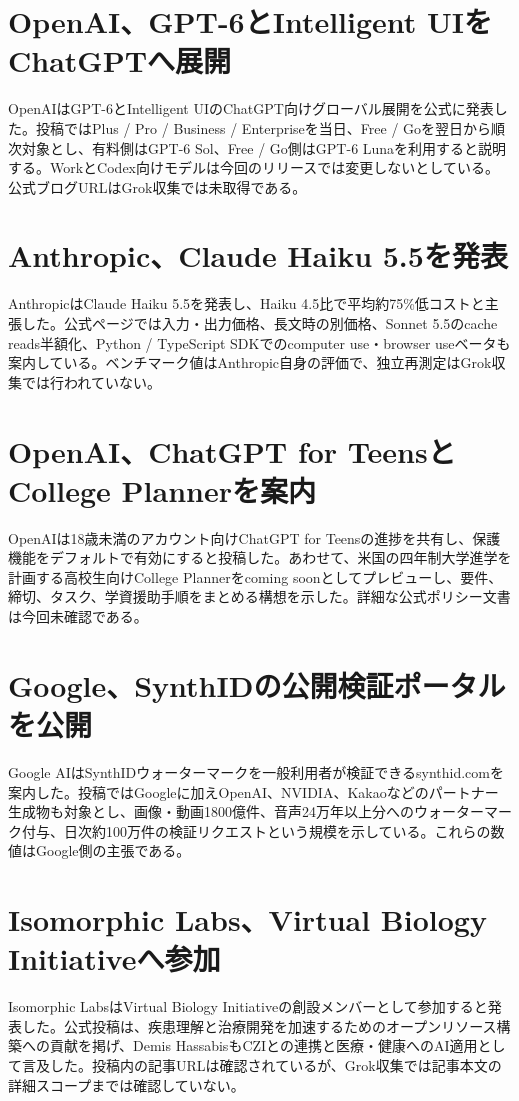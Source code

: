 \section{OpenAI、GPT-6とIntelligent UIをChatGPTへ展開}
OpenAIはGPT-6とIntelligent UIのChatGPT向けグローバル展開を公式に発表した。投稿ではPlus / Pro / Business / Enterpriseを当日、Free / Goを翌日から順次対象とし、有料側はGPT-6 Sol、Free / Go側はGPT-6 Lunaを利用すると説明する。WorkとCodex向けモデルは今回のリリースでは変更しないとしている。公式ブログURLはGrok収集では未取得である。

\section{Anthropic、Claude Haiku 5.5を発表}
AnthropicはClaude Haiku 5.5を発表し、Haiku 4.5比で平均約75\%低コストと主張した。公式ページでは入力・出力価格、長文時の別価格、Sonnet 5.5のcache reads半額化、Python / TypeScript SDKでのcomputer use・browser useベータも案内している。ベンチマーク値はAnthropic自身の評価で、独立再測定はGrok収集では行われていない。

\section{OpenAI、ChatGPT for TeensとCollege Plannerを案内}
OpenAIは18歳未満のアカウント向けChatGPT for Teensの進捗を共有し、保護機能をデフォルトで有効にすると投稿した。あわせて、米国の四年制大学進学を計画する高校生向けCollege Plannerをcoming soonとしてプレビューし、要件、締切、タスク、学資援助手順をまとめる構想を示した。詳細な公式ポリシー文書は今回未確認である。

\section{Google、SynthIDの公開検証ポータルを公開}
Google AIはSynthIDウォーターマークを一般利用者が検証できるsynthid.comを案内した。投稿ではGoogleに加えOpenAI、NVIDIA、Kakaoなどのパートナー生成物も対象とし、画像・動画1800億件、音声24万年以上分へのウォーターマーク付与、日次約100万件の検証リクエストという規模を示している。これらの数値はGoogle側の主張である。

\section{Isomorphic Labs、Virtual Biology Initiativeへ参加}
Isomorphic LabsはVirtual Biology Initiativeの創設メンバーとして参加すると発表した。公式投稿は、疾患理解と治療開発を加速するためのオープンリソース構築への貢献を掲げ、Demis HassabisもCZIとの連携と医療・健康へのAI適用として言及した。投稿内の記事URLは確認されているが、Grok収集では記事本文の詳細スコープまでは確認していない。

